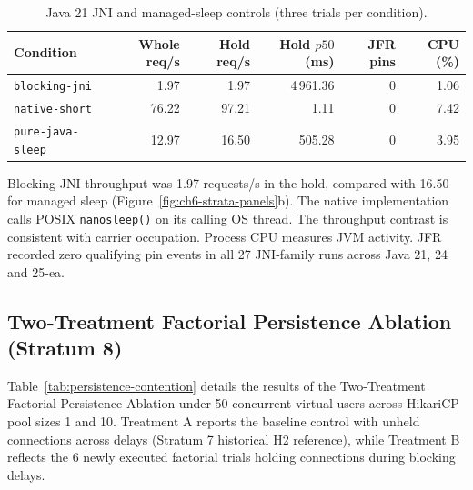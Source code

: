 \begin{table}[htbp]
\centering\small
\caption{Java 21 JNI and managed-sleep controls (three trials per condition).}
\label{tab:jni-telemetry}
\begin{tabular}{lrrrrr}
\toprule
Condition & Whole req/s & Hold req/s & Hold $p50$ (ms) & JFR pins & CPU (\%) \\
\midrule
\texttt{blocking-jni} & 1.97 & 1.97 & 4\,961.36 & 0 & 1.06 \\
\texttt{native-short} & 76.22 & 97.21 & 1.11 & 0 & 7.42 \\
\texttt{pure-java-sleep} & 12.97 & 16.50 & 505.28 & 0 & 3.95 \\
\bottomrule
\end{tabular}
\end{table}

Blocking JNI throughput was 1.97 requests/s in the hold, compared with 16.50 for managed sleep (Figure~\ref{fig:ch6-strata-panels}b). The native implementation calls POSIX \texttt{nanosleep()} on its calling OS thread. The throughput contrast is consistent with carrier occupation. Process CPU measures JVM activity. JFR recorded zero qualifying pin events in all 27 JNI-family runs across Java 21, 24 and 25-ea.

\subsection{Two-Treatment Factorial Persistence Ablation (Stratum 8)}
Table~\ref{tab:persistence-contention} details the results of the Two-Treatment Factorial Persistence Ablation under 50 concurrent virtual users across HikariCP pool sizes 1 and 10. Treatment A reports the baseline control with unheld connections across delays (Stratum 7 historical H2 reference), while Treatment B reflects the 6 newly executed factorial trials holding connections during blocking delays.

